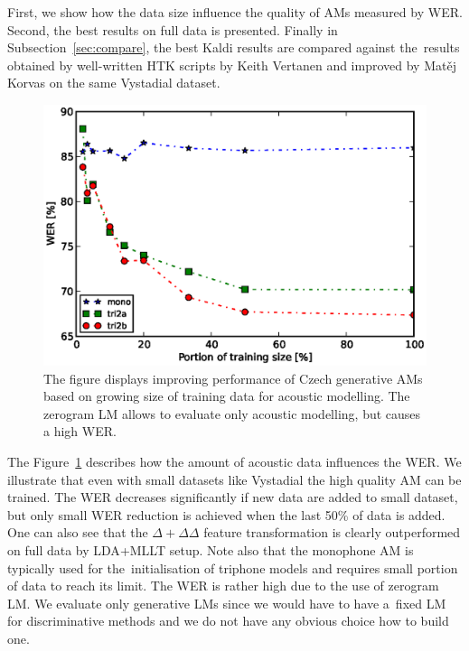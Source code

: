 First, we show how the data size influence the quality of \acp{AM} measured by \ac{WER}.
Second,  the best results on full data is presented.
Finally in Subsection~\ref{sec:compare}, the best Kaldi results are compared against the~results obtained by well-written \ac{HTK} scripts by Keith Vertanen and improved by Matěj Korvas \cite{korvas_2014} on the same Vystadial dataset.

\begin{figure}[!htp]
    \begin{center}
    \includegraphics[scale=0.7]{images/partial-zerogram.ps}
    \caption{The figure displays improving performance of Czech generative \acp{AM} based on growing size of training data for acoustic modelling. The zerogram \acs{LM} allows to evaluate only acoustic modelling, but causes a high \acs{WER}. }
    \label{fig:partials} 
    \end{center}
\end{figure}

The Figure~\ref{fig:partials} describes how the amount of acoustic data influences the \ac{WER}.
We illustrate that even with small datasets like Vystadial the high quality \ac{AM} can be trained.
The WER decreases significantly if new data are added to small dataset, but only small \ac{WER} reduction is achieved when the last 50\% of data is added.
One can also see that the $\Delta+\Delta\Delta$ feature transformation is clearly outperformed on full data by \ac{LDA}+\ac{MLLT} setup.
Note also that the monophone \ac{AM} is typically used for the~initialisation of triphone models and requires small portion of data to reach its limit.
The WER is rather high due to the use of zerogram \ac{LM}.
We evaluate only generative \acp{LM} since we would have to have a~fixed LM for discriminative methods and we do not have any obvious choice how to build one.

